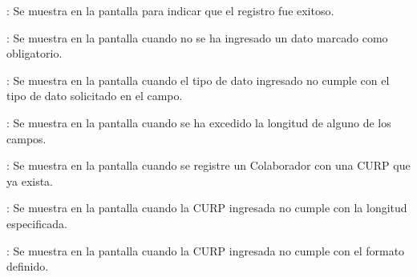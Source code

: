 \begin{Citemize}
	\item {}: Se muestra en la pantalla  para indicar que el registro fue exitoso.
	\item {}: Se muestra en la pantalla  cuando no se ha ingresado un dato marcado como obligatorio.
	\item {}: Se muestra en la pantalla  cuando el tipo de dato ingresado no cumple con el tipo de dato solicitado en el campo.
	\item {}: Se muestra en la pantalla  cuando se ha excedido la longitud de alguno de los campos.
	\item {}: Se muestra en la pantalla  cuando se registre un Colaborador con una CURP que ya exista.
	\item {}: Se muestra en la pantalla  cuando la CURP ingresada no cumple con la longitud especificada.
	\item {}: Se muestra en la pantalla  cuando la CURP ingresada no cumple con el formato definido.
\end{Citemize}
